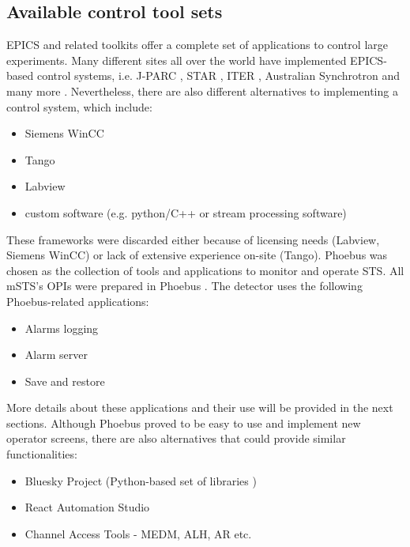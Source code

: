  \subsection{Available control tool sets}
 EPICS and related toolkits offer a complete set of applications to control large experiments. Many different sites all over the world have implemented EPICS-based control systems, i.e. \gls{J-PARC} \cite{J-PARC}, \gls{STAR} \cite{STAR}, \gls{ITER} \cite{ITER}, Australian Synchrotron and many more \cite{EPICS_site}.  Nevertheless, there are also different alternatives to implementing a control system, which include: 
 \begin{itemize}
     \item Siemens WinCC \cite{Camacho:2022fxa,Goralczyk:2022udx}
     \item Tango \cite{Santander-Vela:2021tma}
     \item Labview \cite{State:2022qlw} 
     \item custom software (e.g. python/C++ or stream processing software) \cite{taurus}
 \end{itemize} 
 These frameworks were discarded either because of licensing needs (Labview, Siemens WinCC) or lack of extensive experience on-site (Tango). Phoebus \cite{Phoebus} was chosen as the collection of tools and applications to monitor and operate \gls{STS}. All \gls{mSTS}'s \glspl{OPI} were prepared in Phoebus \cite{Phoebus}. The detector uses the following Phoebus-related applications:
\begin{itemize}
    \item Alarms logging
    \item Alarm server
    \item Save and restore
\end{itemize}
More details about these applications and their use will be provided in the next sections. Although Phoebus proved to be easy to use and implement new operator screens, there are also alternatives that could provide similar functionalities:
\begin{itemize}
    \item Bluesky Project (Python-based set of libraries \cite{Bluesky})
    \item React Automation Studio \cite{React}
    \item Channel Access Tools - MEDM, \gls{ALH}, \gls{AR} etc. 
\end{itemize}

